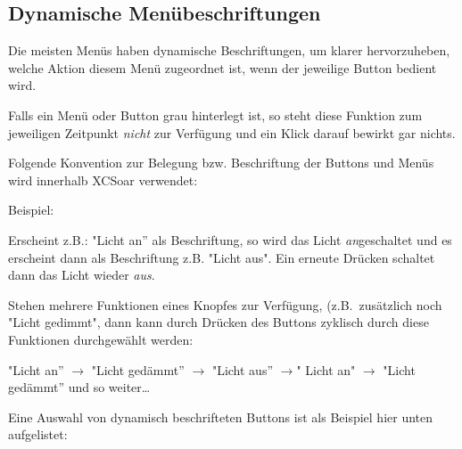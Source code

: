 \subsection*{Dynamische Menübeschriftungen}
Die meisten Menüs haben dynamische Beschriftungen, um klarer hervorzuheben, welche Aktion diesem Menü zugeordnet ist, wenn der jeweilige Button bedient wird.

Falls ein Menü oder Button grau hinterlegt ist, so steht diese Funktion zum jeweiligen Zeitpunkt \emph{nicht} zur Verfügung und ein Klick darauf bewirkt gar nichts.

Folgende Konvention zur Belegung bzw. Beschriftung der Buttons und Menüs wird  innerhalb \textsf{XCSoar} verwendet:

Beispiel:

Erscheint z.B.:  "Licht an'' als Beschriftung, so  wird das Licht \emph{an}geschaltet und  es erscheint dann als Beschriftung z.B. "Licht aus".  Ein erneute Drücken schaltet dann das Licht wieder \emph{aus}.

Stehen mehrere Funktionen eines Knopfes zur Verfügung, (z.B.\ zusätzlich noch "Licht gedimmt", dann kann durch Drücken des Buttons zyklisch durch diese Funktionen durchgewählt werden:


\begin{center}
"Licht an'' $\rightarrow$ "Licht gedämmt'' $\rightarrow$ "Licht aus'' $\rightarrow$" Licht an" $\rightarrow$ "Licht gedämmt'' und so weiter\dots
\end{center}

Eine Auswahl von dynamisch beschrifteten Buttons ist als Beispiel hier unten aufgelistet:

